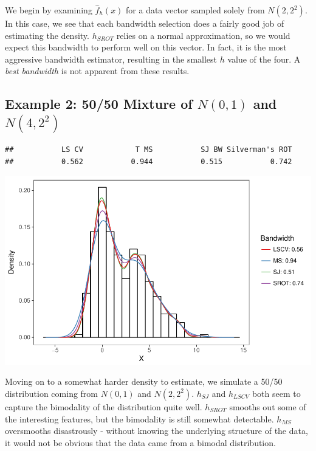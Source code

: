 \documentclass[]{article}
\begin{document}
We begin by examining \(\widehat{f}_h(x)\) for a data vector sampled
solely from \(N(2, 2^2)\). In this case, we see that each bandwidth
selection does a fairly good job of estimating the density. \(h_{SROT}\)
relies on a normal approximation, so we would expect this bandwidth to
perform well on this vector. In fact, it is the most aggressive
bandwidth estimator, resulting in the smallest \(h\) value of the four.
A \emph{best bandwidth} is not apparent from these results.

\newpage

\subsection{Example 2: 50/50 Mixture of $N(0, 1)$ and $N(4, 2^2)$}

\begin{verbatim}
##           LS CV            T MS           SJ BW Silverman's ROT 
##           0.562           0.944           0.515           0.742
\end{verbatim}

\begin{center}\includegraphics{FinalReport_files/figure-latex/unnamed-chunk-7-1} \end{center}

Moving on to a somewhat harder density to estimate, we simulate a 50/50
distribution coming from \(N(0,1)\) and \(N(2, 2^2)\). \(h_{SJ}\) and
\(h_{LSCV}\) both seem to capture the bimodality of the distribution
quite well. \(h_{SROT}\) smooths out some of the interesting features,
but the bimodality is still somewhat detectable. \(h_{MS}\) oversmooths
disastrously - without knowing the underlying structure of the data, it
would not be obvious that the data came from a bimodal distribution.
\end{document}
